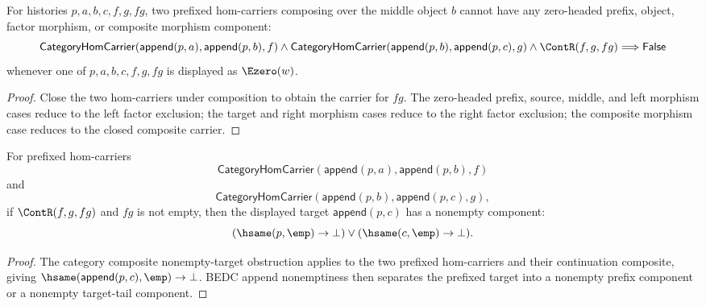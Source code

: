 \begin{theorem}
\label{thm:functor-prefix-hom-carrier-comp-zero-headed-component-absurd}
For histories $p,a,b,c,f,g,fg$, two prefixed hom-carriers composing over the
middle object $b$ cannot have any zero-headed prefix, object, factor morphism,
or composite morphism component:
$$
\mathsf{CategoryHomCarrier}(\mathsf{append}(p,a),\mathsf{append}(p,b),f)
\land
\mathsf{CategoryHomCarrier}(\mathsf{append}(p,b),\mathsf{append}(p,c),g)
\land
\ContR(f,g,fg)
\Longrightarrow
\mathsf{False}
$$
whenever one of $p,a,b,c,f,g,fg$ is displayed as \(\Ezero(w)\).
\end{theorem}
\begin{proof}
Close the two hom-carriers under composition to obtain the carrier for
$fg$. The zero-headed prefix, source, middle, and left morphism cases reduce to
the left factor exclusion; the target and right morphism cases reduce to the
right factor exclusion; the composite morphism case reduces to the closed
composite carrier.
\end{proof}

\begin{theorem}
\label{thm:functor-prefix-hom-carrier-comp-nonempty-target-component-split}
For prefixed hom-carriers
$$
\mathsf{CategoryHomCarrier}(\mathsf{append}(p,a),\mathsf{append}(p,b),f)
$$
and
$$
\mathsf{CategoryHomCarrier}(\mathsf{append}(p,b),\mathsf{append}(p,c),g),
$$
if $\ContR(f,g,fg)$ and $fg$ is not empty, then the displayed target
$\mathsf{append}(p,c)$ has a nonempty component:
$$
(\hsame(p,\emp)\to\bot)\vee(\hsame(c,\emp)\to\bot).
$$
\end{theorem}
\begin{proof}
The category composite nonempty-target obstruction applies to the two
prefixed hom-carriers and their continuation composite, giving
$\hsame(\mathsf{append}(p,c),\emp)\to\bot$. BEDC append nonemptiness then
separates the prefixed target into a nonempty prefix component or a nonempty
target-tail component.
\end{proof}


